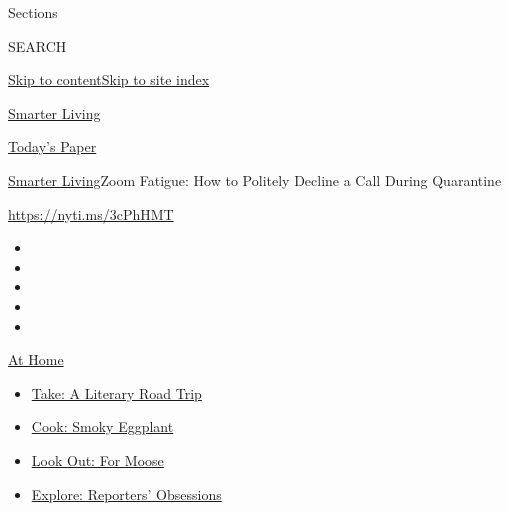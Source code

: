 Sections

SEARCH

\protect\hyperlink{site-content}{Skip to
content}\protect\hyperlink{site-index}{Skip to site index}

\href{https://www.nytimes3xbfgragh.onion/section/smarter-living}{Smarter
Living}

\href{https://myaccount.nytimes3xbfgragh.onion/auth/login?response_type=cookie\&client_id=vi}{}

\href{https://www.nytimes3xbfgragh.onion/section/todayspaper}{Today's
Paper}

\href{/section/smarter-living}{Smarter Living}\textbar{}Zoom Fatigue:
How to Politely Decline a Call During Quarantine

\url{https://nyti.ms/3cPhHMT}

\begin{itemize}
\item
\item
\item
\item
\item
\end{itemize}

\href{https://www.nytimes3xbfgragh.onion/spotlight/at-home?action=click\&pgtype=Article\&state=default\&region=TOP_BANNER\&context=at_home_menu}{At
Home}

\begin{itemize}
\tightlist
\item
  \href{https://www.nytimes3xbfgragh.onion/2020/07/28/books/time-for-a-literary-road-trip.html?action=click\&pgtype=Article\&state=default\&region=TOP_BANNER\&context=at_home_menu}{Take:
  A Literary Road Trip}
\item
  \href{https://www.nytimes3xbfgragh.onion/2020/07/29/magazine/bored-with-your-home-cooking-some-smoky-eggplant-will-fix-that.html?action=click\&pgtype=Article\&state=default\&region=TOP_BANNER\&context=at_home_menu}{Cook:
  Smoky Eggplant}
\item
  \href{https://www.nytimes3xbfgragh.onion/2020/07/27/travel/moose-michigan-isle-royale.html?action=click\&pgtype=Article\&state=default\&region=TOP_BANNER\&context=at_home_menu}{Look
  Out: For Moose}
\item
  \href{https://www.nytimes3xbfgragh.onion/interactive/2020/at-home/even-more-reporters-editors-diaries-lists-recommendations.html?action=click\&pgtype=Article\&state=default\&region=TOP_BANNER\&context=at_home_menu}{Explore:
  Reporters' Obsessions}
\end{itemize}

